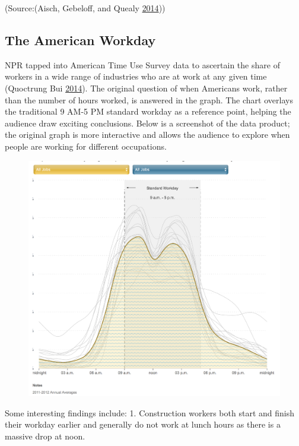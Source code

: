 \documentclass[]{book}
\begin{document}
(Source:(Aisch, Gebeloff, and Quealy
\protect\hyperlink{ref-migration}{2014}))

\subsection{The American Workday}\label{the-american-workday}

NPR tapped into American Time Use Survey data to ascertain the share of
workers in a wide range of industries who are at work at any given time
(Quoctrung Bui \protect\hyperlink{ref-NPR_workday}{2014}). The original
question of when Americans work, rather than the number of hours worked,
is answered in the graph. The chart overlays the traditional 9 AM-5 PM
standard workday as a reference point, helping the audience draw
exciting conclusions. Below is a screenshot of the data product; the
original graph is more interactive and allows the audience to explore
when people are working for different occupations.

\begin{figure}
\centering
\includegraphics{images/npr_workday.png}
\caption{}
\end{figure}

Some interesting findings include: 1. Construction workers both start
and finish their workday earlier and generally do not work at lunch
hours as there is a massive drop at noon.
\end{document}
